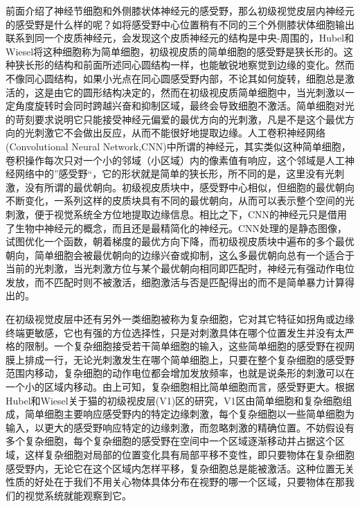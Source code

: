\documentclass{article}
\begin{document}
\begin{spacing}{1.0}
	前面介绍了神经节细胞和外侧膝状体神经元的感受野，那么初级视觉皮层内神经元的感受野是什么样的呢？如将感受野中心位置稍有不同的三个外侧膝状体细胞输出联系到同一个皮质神经元，会发现这个皮质神经元的结构是中央-周围的，Hubel和Wiesel将这种细胞称为简单细胞，初级视皮质的简单细胞的感受野是狭长形的。这种狭长形的结构和前面所述同心圆结构一样，也能敏锐地察觉到边缘的变化。然而不像同心圆结构，如果小光点在同心圆感受野内部，不论其如何旋转，细胞总是激活的，这是由它的圆形结构决定的，然而在初级视皮质简单细胞中，当光刺激以一定角度旋转时会同时跨越兴奋和抑制区域，最终会导致细胞不激活。简单细胞对光的苛刻要求说明它只能接受神经元偏爱的最优方向的光刺激，凡是不是这个最优方向的光刺激它不会做出反应，从而不能很好地提取边缘。人工卷积神经网络(Convolutional Neural Network,CNN)中所谓的神经元，其实类似这种简单细胞，卷积操作每次只对一个小的邻域（小区域）内的像素值有响应，这个邻域是人工神经网络中的”感受野“，它的形状就是简单的狭长形，所不同的是，这里没有光刺激，没有所谓的最优朝向。初级视皮质块中，感受野中心相似，但细胞的最优朝向不断变化，一系列这样的皮质块具有不同的最优朝向，从而可以表示整个空间的光刺激，便于视觉系统全方位地提取边缘信息。相比之下，CNN的神经元只是借用了生物中神经元的概念，而且还是最精简化的神经元。CNN处理的是静态图像，试图优化一个函数，朝着梯度的最优方向下降，而初级视皮质块中遍布的多个最优朝向，简单细胞会被最优朝向的边缘兴奋或抑制，这么多最优朝向总有一个适合于当前的光刺激，当光刺激方位与某个最优朝向相同即匹配时，神经元有强动作电位发放，而不匹配时则不被激活，细胞激活与否是匹配得出的而不是简单暴力计算得出的。\par 
	在初级视觉皮层中还有另外一类细胞被称为复杂细胞，它对其它特征如拐角或边缘终端更敏感，它也有强的方位选择性，只是对刺激具体在哪个位置发生并没有太严格的限制。一个复杂细胞接受若干简单细胞的输入，这些简单细胞的感受野在视网膜上排成一行，无论光刺激发生在哪个简单细胞上，只要在整个复杂细胞的感受野范围内移动，复杂细胞的动作电位都会增加发放频率，也就是说条形的刺激可以在一个小的区域内移动。由上可知，复杂细胞相比简单细胞而言，感受野更大。根据Hubel和Wiesel关于猫的初级视皮层(V1)区的研究，V1区由简单细胞和复杂细胞组成，简单细胞主要响应感受野内的特定边缘刺激，每个复杂细胞以一些简单细胞为输入，以更大的感受野响应特定的边缘刺激，而忽略刺激的精确位置\cite{hsh}。不妨假设有多个复杂细胞，每个复杂细胞的感受野在空间中一个区域逐渐移动并占据这个区域，这样复杂细胞对局部的位置变化具有局部平移不变性，即只要物体在复杂细胞感受野内，无论它在这个区域内怎样平移，复杂细胞总是能被激活。这种位置无关性质的好处在于我们不用关心物体具体分布在视野的哪一个区域，只要物体在那我们的视觉系统就能观察到它。\par 

\end{spacing}
\end{document}
